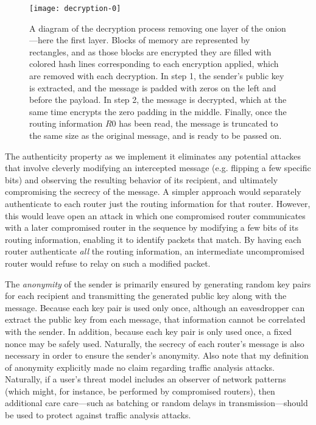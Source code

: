 \documentclass[letterpaper,twocolumn,amsmath,amssymb,pre,aps,10pt]{revtex4-1}
\begin{document}
\begin{figure*}
  \begin{center}
    \texttt{[image: decryption-0]}
  \end{center}
  \caption{A diagram of the decryption process removing one layer of
    the onion---here the first layer.  Blocks of memory are
    represented by rectangles, and as those blocks are encrypted they
    are filled with colored hash lines corresponding to each
    encryption applied, which are removed with each decryption.  In
    step 1, the sender's public key is extracted, and the message is
    padded with zeros on the left and before the payload.  In step 2,
    the message is decrypted, which at the same time encrypts the zero
    padding in the middle.  Finally, once the routing information $R0$
    has been read, the message is truncated to the same size as the
    original message, and is ready to be passed
    on.}\label{fig:decryption}
\end{figure*}

The authenticity property as we implement it eliminates any potential
attackes that involve cleverly modifying an intercepted message
(e.g. flipping a few specific bits) and observing the resulting
behavior of its recipient, and ultimately compromising the secrecy of
the message.  A simpler approach would separately authenticate to each
router just the routing information for that router.  However, this
would leave open an attack in which one compromised router
communicates with a later compromised router in the sequence by
modifying a few bits of its routing information, enabling it to
identify packets that match.  By having each router authenticate
\emph{all} the routing information, an intermediate uncompromised
router would refuse to relay on such a modified packet.

The \emph{anonymity} of the sender is primarily ensured by generating
random key pairs for each recipient and transmitting the generated
public key along with the message.  Because each key pair is used only
once, although an eavesdropper can extract the public key from each
message, that information cannot be correlated with the sender.  In
addition, because each key pair is only used once, a fixed nonce may
be safely used.  Naturally, the secrecy of each router's message is
also necessary in order to ensure the sender's anonymity.  Also note
that my definition of anonymity explicitly made no claim regarding
traffic analysis attacks.  Naturally, if a user's threat model
includes an observer of network patterns (which might, for instance,
be performed by compromised routers), then additional care care---such
as batching or random delays in transmission---should be used to
protect against traffic analysis attacks.
\end{document}
